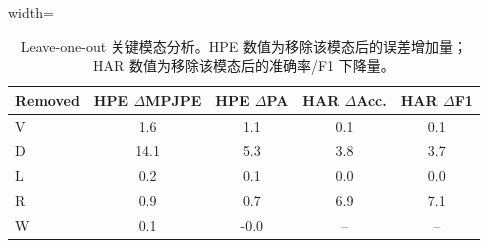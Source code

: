 \begin{table}[H]
\centering
\caption{Leave-one-out 关键模态分析。HPE 数值为移除该模态后的误差增加量；HAR 数值为移除该模态后的准确率/F1 下降量。}
\label{tab:loo_cn}
\scriptsize
\begin{adjustbox}{width=\linewidth}
\begin{tabular}{lcccc}
\toprule
Removed & HPE $\Delta$MPJPE & HPE $\Delta$PA & HAR $\Delta$Acc. & HAR $\Delta$F1 \\
\midrule
V & 1.6 & 1.1 & 0.1 & 0.1 \\
D & 14.1 & 5.3 & 3.8 & 3.7 \\
L & 0.2 & 0.1 & 0.0 & 0.0 \\
R & 0.9 & 0.7 & 6.9 & 7.1 \\
W & 0.1 & -0.0 & -- & -- \\
\bottomrule
\end{tabular}
\end{adjustbox}
\end{table}
